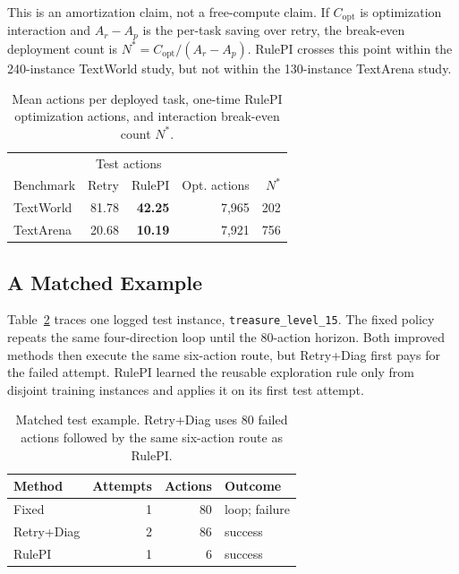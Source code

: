 \documentclass[11pt]{article}
\begin{document}
This is an amortization claim, not a free-compute claim.
If $C_{\mathrm{opt}}$ is optimization interaction and $A_r-A_p$ is the per-task saving over retry, the break-even deployment count is
$N^*=C_{\mathrm{opt}}/(A_r-A_p)$.
RulePI crosses this point within the 240-instance TextWorld study, but not within the 130-instance TextArena study.

\begin{table}[t]
\centering
\small
\begin{tabular}{lrrrr}
\toprule
 & \multicolumn{2}{c}{Test actions} & & \\
Benchmark & Retry & RulePI & Opt. actions & $N^*$ \\
\midrule
TextWorld & 81.78 & \textbf{42.25} & 7,965 & 202 \\
TextArena & 20.68 & \textbf{10.19} & 7,921 & 756 \\
\bottomrule
\end{tabular}
\caption{Mean actions per deployed task, one-time RulePI optimization actions, and interaction break-even count $N^*$.}
\label{tab:cost}
\end{table}

\subsection{A Matched Example}

Table~\ref{tab:example} traces one logged test instance, \texttt{treasure\_level\_15}.
The fixed policy repeats the same four-direction loop until the 80-action horizon.
Both improved methods then execute the same six-action route, but Retry+Diag first pays for the failed attempt.
RulePI learned the reusable exploration rule only from disjoint training instances and applies it on its first test attempt.

\begin{table}[t]
\centering
\small
\begin{tabular}{lrrl}
\toprule
Method & Attempts & Actions & Outcome \\
\midrule
Fixed & 1 & 80 & loop; failure \\
Retry+Diag & 2 & 86 & success \\
RulePI & 1 & 6 & success \\
\bottomrule
\end{tabular}
\caption{Matched test example. Retry+Diag uses 80 failed actions followed by the same six-action route as RulePI.}
\label{tab:example}
\end{table}
\end{document}
